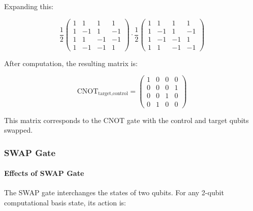 Expanding this:

\[
  \frac{1}{2} \begin{pmatrix}
    1 & 1 & 1 & 1 \\
    1 & -1 & 1 & -1 \\
    1 & 1 & -1 & -1 \\
    1 & -1 & -1 & 1
    \end{pmatrix} \cdot \frac{1}{2} \begin{pmatrix}
    1 & 1 & 1 & 1 \\
    1 & -1 & 1 & -1 \\
    1 & -1 & -1 & 1 \\
    1 & 1 & -1 & -1
  \end{pmatrix}
\]

After computation, the resulting matrix is:

\[
  \text{CNOT}_{\text{target,control}} = \begin{pmatrix}
    1 & 0 & 0 & 0 \\
    0 & 0 & 0 & 1 \\
    0 & 0 & 1 & 0 \\
    0 & 1 & 0 & 0
  \end{pmatrix}
\]

This matrix corresponds to the CNOT gate with the control and target qubits
swapped.

\vspace{0.3cm}

\subsubsection*{SWAP Gate}


\paragraph{Effects of SWAP Gate}\label{par:Effects of SWAP Gate}
The SWAP gate interchanges the states of two qubits. For any 2-qubit
computational basis state, its action is:

